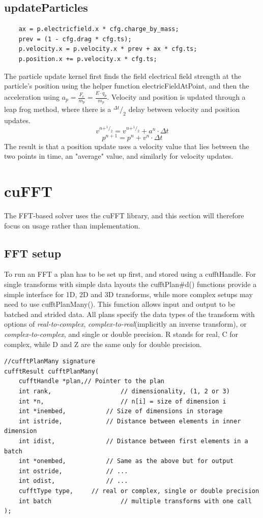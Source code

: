 \subsection{updateParticles}
\begin{lstlisting}
	ax = p.electricfield.x * cfg.charge_by_mass;
	prev = (1 - cfg.drag * cfg.ts);
	p.velocity.x = p.velocity.x * prev + ax * cfg.ts;
	p.position.x += p.velocity.x * cfg.ts;
\end{lstlisting}
The particle update kernel first finds the field electrical field strength at the particle's position using the helper
function electricFieldAtPoint, and then the acceleration using $a_p=\frac{F_e}{m_p} = \frac{E \cdot q_p}{m_p}$. Velocity and position
is updated through a leap frog method, where there is a $^{\Delta t}\!/_2$ delay between velocity and position updates.
$$ v^{n+ ^1\!/_2 } = v^{n+ ^1\!/_2 } + a^n \cdot \Delta t $$
$$ p^{n+1} = p^n + v^n \cdot \Delta t $$
The result is that a position update uses a velocity value that lies between the two points in time, an "average" value,
and similarly for velocity updates.


\section{cuFFT}
The FFT-based solver uses the cuFFT library, and this section will therefore focus on usage rather than implementation.

\subsection{FFT setup}
To run an FFT a plan has to be set up first, and stored using a cufftHandle. For single transforms with simple data
layouts the cufftPlan\#d() functions provide a simple interface for 1D, 2D and 3D transforms, while more complex setups
may need to use cufftPlanMany(). This function allows input and output  to be batched and strided data. All plans
specify the data types of the transform with options of \emph{real-to-complex}, \emph{complex-to-real}(implicitly an
inverse transform), or \emph{complex-to-complex}, and single or double precision. R stands for real, C for complex,
while D and Z are the same only for double precision.
\begin{lstlisting}
//cufftPlanMany signature
cufftResult cufftPlanMany(
	cufftHandle *plan,// Pointer to the plan
	int rank,					// dimensionality, (1, 2 or 3)
	int *n,						// n[i] = size of dimension i
	int *inembed,			// Size of dimensions in storage
	int istride,			// Distance between elements in inner dimension
	int idist,				// Distance between first elements in a batch
	int *onembed,			// Same as the above but for output
	int ostride,			// ...
	int odist,				// ...
	cufftType type,		// real or complex, single or double precision
	int batch					// multiple transforms with one call
);
\end{lstlisting}

